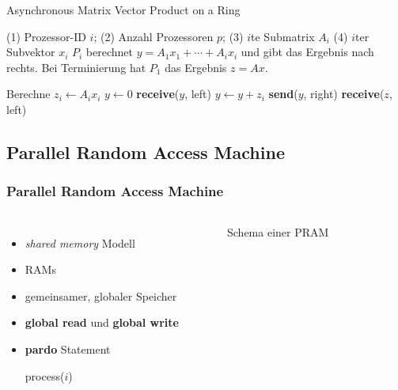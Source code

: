 \begin{frame}
    \begin{algorithm}[H]
        \caption{Asynchronous Matrix Vector Product on a Ring \cite[S.18]{jaja}}
        \begin{algorithmic}[1]
        \Require (1) Prozessor-ID $i$; (2) Anzahl Prozessoren $p$;
        (3) $i$te Submatrix $A_i$
        (4) $i$ter Subvektor $x_i$
        \Ensure $P_i$ berechnet $y = A_1x_1 + \cdots + A_ix_i$
        und gibt das Ergebnis nach rechts. Bei Terminierung hat $P_1$ das
        Ergebnis $z = Ax$.
        \begin{multicols}{2}
            \State Berechne $z_i \gets A_ix_i$
                \State $y \gets 0$
            \Else
                \State \textbf{receive}($y$, left)
            \EndIf
            \State $y \gets y + z_i$
            \State \textbf{send}($y$, right)
                \State \textbf{receive}($z$, left)
            \EndIf
        \end{multicols}
        \end{algorithmic}
    \end{algorithm}
\end{frame}

\subsection{Parallel Random Access Machine}
\begin{frame}
    \frametitle{Parallel Random Access Machine}
    \begin{columns}
        \begin{itemize}
            \item \emph{shared memory} Modell
            \item RAMs
            \item gemeinsamer, globaler Speicher
            \item \textbf{global read} und \textbf{global write}
            \item \textbf{pardo} Statement
                \begin{algorithmic}
                        \State process($i$)
                    \EndParDo
                \end{algorithmic}
        \end{itemize}
        \begin{figure}
            \centering
            
            \caption{Schema einer PRAM}
        \end{figure}
    \end{columns}
\end{frame}

